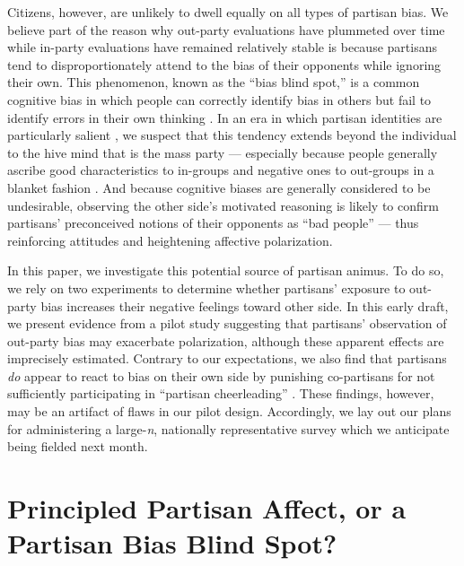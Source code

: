 \documentclass[12pt, letterpaper]{article}
\begin{document}
Citizens, however, are unlikely to dwell equally on all types of partisan bias. We believe part of the reason why out-party evaluations have plummeted over time while in-party evaluations have remained relatively stable \citep{IyengarSoodLelkes2012,Hetherington2009} is because partisans tend to disproportionately attend to the bias of their opponents while ignoring their own. This phenomenon, known as the ``bias blind spot,'' is a common cognitive bias in which people can correctly identify bias in others but fail to identify errors in their own thinking \citep{proninetal_2002,pronin_2007}. In an era in which partisan identities are particularly salient \citep{bartels2000,Hetherington2001}, we suspect that this tendency extends beyond the individual to the hive mind that is the mass party --- especially because people generally ascribe good characteristics to in-groups and negative ones to out-groups in a blanket fashion \citep{alexander1999images}. And because cognitive biases are generally considered to be undesirable, observing the other side's motivated reasoning is likely to confirm partisans' preconceived notions of their opponents as ``bad people'' --- thus reinforcing attitudes and heightening affective polarization. 

In this paper, we investigate this potential source of partisan animus. To do so, we rely on two experiments to determine whether partisans' exposure to out-party bias increases their negative feelings toward other side. In this early draft, we present evidence from a pilot study suggesting that partisans' observation of out-party bias may exacerbate polarization, although these apparent effects are imprecisely estimated. Contrary to our expectations, we also find that partisans \textit{do} appear to react to bias on their own side by punishing co-partisans for not sufficiently participating in ``partisan cheerleading'' \citep{bullocketal_2015}. These findings, however, may be an artifact of flaws in our pilot design. Accordingly, we lay out our plans for administering a large-\textit{n}, nationally representative survey which we anticipate being fielded next month. %

\section*{Principled Partisan Affect, or a Partisan Bias Blind Spot?}
\end{document}
